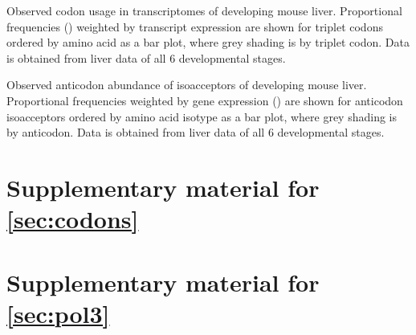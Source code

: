     {Observed codon usage in \mrna transcriptomes of developing mouse liver.}
    {Proportional frequencies (\rcu) weighted by transcript expression are shown
    for triplet codons ordered by amino acid as a bar plot, where grey shading
    is by triplet codon. Data is obtained from liver \rnaseq data of all \num{6}
    developmental stages.}

    {Observed anticodon abundance of \trna isoacceptors of developing mouse
    liver.}
    {Proportional frequencies weighted by \trna gene expression (\raa) are shown
    for anticodon isoacceptors ordered by amino acid isotype as a bar plot,
    where grey shading is by anticodon. Data is obtained from liver 
    \chipseq data of all \num{6} developmental stages.}

\chapter{Supplementary material for \texorpdfstring{\cref*{sec:codons}}{chapter 3}}

\chapter{Supplementary material for \texorpdfstring{\cref*{sec:pol3}}{chapter 4}}

\endgroup
